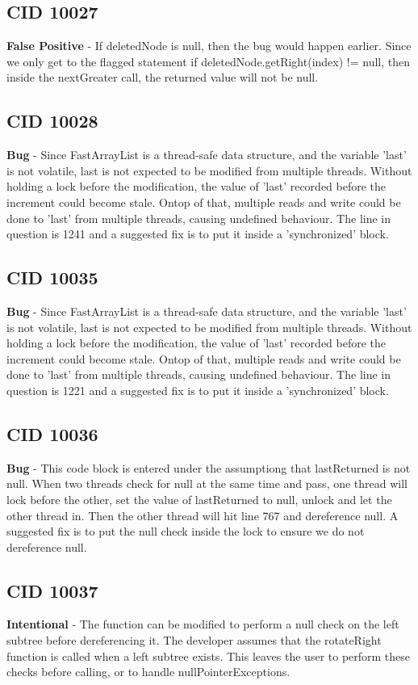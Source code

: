 \documentclass[12pt]{article}
\begin{document}
\subsection{CID 10027}
\textbf{False Positive} - If deletedNode is null, then the bug would happen earlier. Since we only get to the flagged statement if deletedNode.getRight(index) != null, then inside the nextGreater call, the returned value will not be null.
\subsection{CID 10028}
\textbf{Bug} - Since FastArrayList is a thread-safe data structure, and the variable 'last' is not volatile, last is not expected to be modified from multiple threads. Without holding a lock before the modification, the value of 'last' recorded before the increment could become stale. Ontop of that, multiple reads and write could be done to 'last' from multiple threads, causing undefined behaviour. The line in question is 1241 and a suggested fix is to put it inside a 'synchronized' block.
\subsection{CID 10035}
\textbf{Bug} - Since FastArrayList is a thread-safe data structure, and the variable 'last' is not volatile, last is not expected to be modified from multiple threads. Without holding a lock before the modification, the value of 'last' recorded before the increment could become stale. Ontop of that, multiple reads and write could be done to 'last' from multiple threads, causing undefined behaviour. The line in question is 1221 and a suggested fix is to put it inside a 'synchronized' block.
\subsection{CID 10036}
\textbf{Bug} - This code block is entered under the assumptiong that lastReturned is not null. When two threads check for null at the same time and pass, one thread will lock before the other, set the value of lastReturned to null, unlock and let the other thread in. Then the other thread will hit line 767 and dereference null. A suggested fix is to put the null check inside the lock to ensure we do not dereference null.
\subsection{CID 10037}
\textbf{Intentional} - The function can be modified to perform a null check on the left subtree before dereferencing it. The developer assumes that the rotateRight function is called when a left subtree exists. This leaves the user to perform these checks before calling, or to handle nullPointerExceptions.
\end{document}
